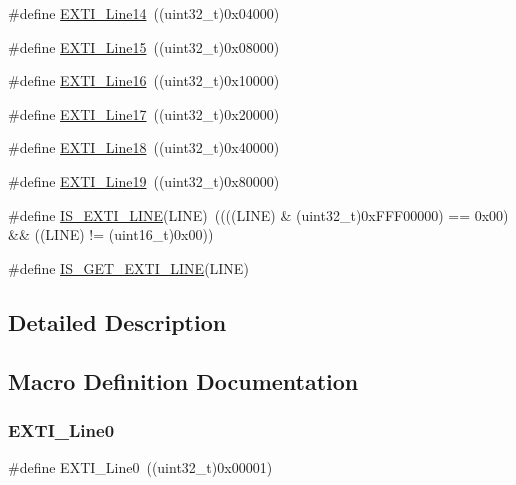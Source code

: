 \begin{DoxyCompactItemize}
\item 
\#define \hyperlink{group___e_x_t_i___lines_ga7b3821ad1b7a00b49c27075688f48101}{E\+X\+T\+I\+\_\+\+Line14}~((uint32\+\_\+t)0x04000)
\item 
\#define \hyperlink{group___e_x_t_i___lines_gafc5ea85d1fc095a855fde8977a338c4c}{E\+X\+T\+I\+\_\+\+Line15}~((uint32\+\_\+t)0x08000)
\item 
\#define \hyperlink{group___e_x_t_i___lines_ga21326db7db8ca614c746b7f52dc45ead}{E\+X\+T\+I\+\_\+\+Line16}~((uint32\+\_\+t)0x10000)
\item 
\#define \hyperlink{group___e_x_t_i___lines_ga3e0fc18bc0722adc09605e3093b24c6a}{E\+X\+T\+I\+\_\+\+Line17}~((uint32\+\_\+t)0x20000)
\item 
\#define \hyperlink{group___e_x_t_i___lines_ga6cdf346a3e7a3c8dbb036aca6741207c}{E\+X\+T\+I\+\_\+\+Line18}~((uint32\+\_\+t)0x40000)
\item 
\#define \hyperlink{group___e_x_t_i___lines_ga49ac0744621f88d432d85838483ad1de}{E\+X\+T\+I\+\_\+\+Line19}~((uint32\+\_\+t)0x80000)
\item 
\#define \hyperlink{group___e_x_t_i___lines_gaade8b8717a1d78f83d3cf180e2817557}{I\+S\+\_\+\+E\+X\+T\+I\+\_\+\+L\+I\+NE}(L\+I\+NE)~((((L\+I\+NE) \& (uint32\+\_\+t)0x\+F\+F\+F00000) == 0x00) \&\& ((\+L\+I\+N\+E) != (uint16\+\_\+t)0x00))
\item 
\#define \hyperlink{group___e_x_t_i___lines_ga77c85c7b8426c6cfe91b4f5a2c58ecda}{I\+S\+\_\+\+G\+E\+T\+\_\+\+E\+X\+T\+I\+\_\+\+L\+I\+NE}(L\+I\+NE)
\end{DoxyCompactItemize}


\subsection{Detailed Description}


\subsection{Macro Definition Documentation}
\mbox{\label{group___e_x_t_i___lines_gac2a65680200dd5f4f7eab29cd4091a75}} 
\subsubsection{\texorpdfstring{E\+X\+T\+I\+\_\+\+Line0}{EXTI\_Line0}}
{\footnotesize\ttfamily \#define E\+X\+T\+I\+\_\+\+Line0~((uint32\+\_\+t)0x00001)}

